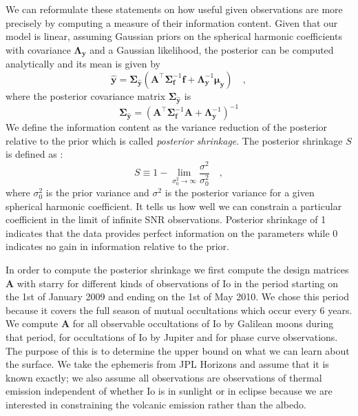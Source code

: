 \documentclass[modern]{aastex62}
\begin{document}
We can reformulate these statements on how useful given observations are more precisely by computing a measure of their information content.
Given that our model is linear, assuming Gaussian priors on the spherical harmonic coefficients with covariance $\boldsymbol{\Lambda}_\mathbf{y}$ and a Gaussian likelihood, the posterior can be computed analytically and its mean is given by
\begin{equation}
    \widehat{\mathbf{y}}=\boldsymbol{\Sigma}_{\hat{\mathbf{y}}}\left(\mathbf{A}^{\top} \boldsymbol{\Sigma}_{\mathbf{f}}^{-1} \mathbf{f}+\boldsymbol{\Lambda}_{\mathbf{y}}^{-1} \boldsymbol{\mu}_{\mathbf{y}}\right)
    \quad,
    \label{eq:linear_solve_mean}
\end{equation}
where the posterior covariance matrix $\boldsymbol{\Sigma}_{\hat{\mathbf{y}}}$ is 
\begin{equation}
\boldsymbol{\Sigma}_{\hat{\mathbf{y}}}=\left( \mathbf{A}^{\top} \boldsymbol{\Sigma}_{\mathbf{f}}^{-1} \mathbf{A} +\boldsymbol{\Lambda}_{\mathbf{y}}^{-1}\right)^{-1}
    \label{eq:linear_solve_cov}
\end{equation}
We define the information content as the variance reduction of the posterior relative to the prior which is called \emph{posterior shrinkage}.
The posterior shrinkage $S$ is defined as \citep{luger2021a,betancourt2018}:
\begin{equation}
S \equiv 1-\lim _{\sigma_{0}^{2} \rightarrow \infty} \frac{\sigma^{2}}{\sigma_{0}^{2}}
    \quad,
\end{equation}
where $\sigma^2_0$ is the prior variance and $\sigma^2$ is the posterior variance for a given spherical harmonic coefficient.
It tells us how well we can constrain a particular coefficient in the limit of infinite SNR observations.
Posterior shrinkage of 1 indicates that the data provides perfect information on the parameters while 0 indicates no gain in information relative to the prior.

In order to compute the posterior shrinkage we first compute the design matrices $\mathbf{A}$ with \textsf{starry} for different kinds of observations of Io in the period starting on the 1st of January 2009 and ending on the 1st of May 2010.
We chose this period because it covers the full season of mutual occultations which occur every 6 years.
We compute $\mathbf{A}$ for all observable occultations of Io by Galilean moons during that period, for occultations of Io by Jupiter and for phase curve observations.
The purpose of this is to determine the upper bound on what we can learn about the surface. 
We take the ephemeris from \textsf{JPL Horizons} and assume that it is known exactly; we also assume all observations are observations of thermal emission independent of whether Io is in sunlight or in eclipse because we are interested in constraining the volcanic emission rather than the albedo.
\end{document}
